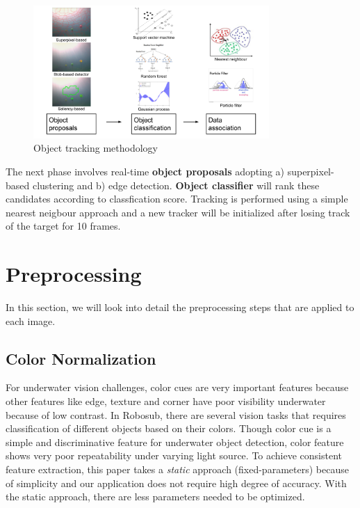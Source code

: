 \documentclass[hyp]{socreport}
\begin{document}
\begin{figure}[H]
\centering
  \includegraphics[width=0.8\textwidth, height=0.3\textheight]{tracking_method.png}
  \caption{Object tracking methodology}
  \label{fig:tracking_methodology}
\end{figure}

The next phase involves real-time \textbf{object proposals} adopting a)
superpixel-based clustering and b) edge detection. \textbf{Object classifier}
will rank these candidates according to classfication score. Tracking is
performed using a simple nearest neigbour approach and a new tracker will be
initialized after losing track of the target for 10 frames.


\chapter{Preprocessing}

In this section, we will look into detail the preprocessing steps that are
applied to each image. 

\section{Color Normalization}

For underwater vision challenges, color cues are very important features because
other features like edge, texture and corner have poor visibility underwater
because of low contrast. In Robosub, there are several vision tasks that
requires classification of different objects based on their colors. Though color
cue is a simple and discriminative feature for underwater object
detection, color feature shows very poor repeatability under varying light
source. To achieve consistent feature extraction, this paper takes a
\textit{static} approach (fixed-parameters) because of simplicity and our
application does not require high degree of accuracy. With the static approach,
there are less parameters needed to be optimized.
\end{document}

